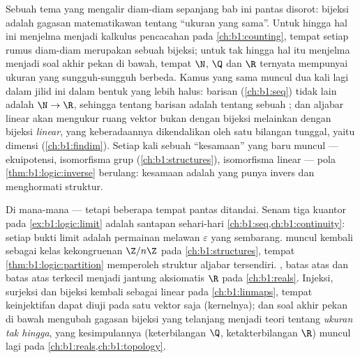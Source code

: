 \begin{remark}\label{rem:b1:logic:interlude}
Sebuah tema yang mengalir diam-diam sepanjang bab ini pantas disorot:
bijeksi adalah gagasan matematikawan tentang ``ukuran yang sama''.
Untuk  hingga hal ini menjelma menjadi kalkulus pencacahan
pada \cref{ch:b1:counting}, tempat setiap rumus diam-diam merupakan
sebuah bijeksi; untuk  tak hingga hal itu menjelma menjadi
soal akhir pekan di bawah, tempat $\N$, $\Q$ dan $\R$ ternyata
mempunyai ukuran yang sungguh-sungguh berbeda. Kamus yang sama muncul
dua kali lagi dalam jilid ini dalam bentuk yang lebih halus: barisan
(\cref{ch:b1:seq}) tidak lain adalah  $\N \to \R$, sehingga
 tentang barisan adalah  tentang sebuah 
; dan aljabar linear akan mengukur ruang vektor bukan dengan
bijeksi melainkan dengan bijeksi \emph{linear}, yang keberadaannya
dikendalikan oleh satu bilangan tunggal, yaitu dimensi
(\cref{ch:b1:findim}). Setiap kali sebuah ``kesamaan'' yang baru
muncul --- ekuipotensi, isomorfisma grup
(\cref{ch:b1:structures}), isomorfisma linear --- pola
\cref{thm:b1:logic:inverse} berulang: kesamaan adalah  yang
punya invers dan menghormati struktur.
\end{remark}

\begin{remark}\label{rem:b1:logic:whereused}
Di mana-mana --- tetapi beberapa tempat pantas ditandai. Senam tiga
kuantor pada \cref{ex:b1:logic:limit} adalah santapan sehari-hari
\cref{ch:b1:seq,ch:b1:continuity}: setiap bukti limit adalah permainan
melawan $\varepsilon$ yang sembarang.  muncul kembali
sebagai kelas kekongruenan $\Z/n\Z$ pada \cref{ch:b1:structures},
tempat  \cref{thm:b1:logic:partition} memperoleh struktur
aljabar tersendiri. , batas atas dan batas atas terkecil
menjadi jantung aksiomatis $\R$ pada \cref{ch:b1:reals}.
Injeksi, surjeksi dan bijeksi kembali sebagai  linear pada
\cref{ch:b1:linmaps}, tempat keinjektifan dapat diuji pada satu
vektor saja (kernelnya); dan soal akhir pekan di bawah mengubah
gagasan bijeksi yang telanjang menjadi teori tentang \emph{ukuran
 tak hingga}, yang kesimpulannya (keterbilangan $\Q$,
ketakterbilangan $\R$) muncul lagi pada
\cref{ch:b1:reals,ch:b1:topology}.
\end{remark}

